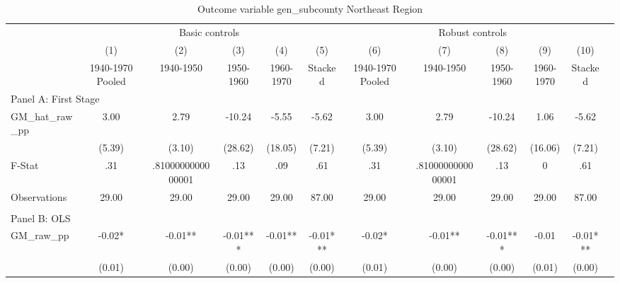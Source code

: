  \begin{table}[htbp]\centering {} \begin{threeparttable} \caption{Outcome variable gen\_subcounty Northeast Region} \begin{tabular}{l*{11}{c}} \toprule
          &\multicolumn{5}{c}{Basic controls}                                   &\multicolumn{5}{c}{Robust controls}                                  \\\cmidrule(lr){2-6}\cmidrule(lr){7-11}
          &\multicolumn{1}{c}{(1)}&\multicolumn{1}{c}{(2)}&\multicolumn{1}{c}{(3)}&\multicolumn{1}{c}{(4)}&\multicolumn{1}{c}{(5)}&\multicolumn{1}{c}{(6)}&\multicolumn{1}{c}{(7)}&\multicolumn{1}{c}{(8)}&\multicolumn{1}{c}{(9)}&\multicolumn{1}{c}{(10)}\\
          &\multicolumn{1}{c}{1940-1970 Pooled}&\multicolumn{1}{c}{1940-1950}&\multicolumn{1}{c}{1950-1960}&\multicolumn{1}{c}{1960-1970}&\multicolumn{1}{c}{Stacked}&\multicolumn{1}{c}{1940-1970 Pooled}&\multicolumn{1}{c}{1940-1950}&\multicolumn{1}{c}{1950-1960}&\multicolumn{1}{c}{1960-1970}&\multicolumn{1}{c}{Stacked}\\
\cmidrule(lr){1-11}
\multicolumn{10}{l}{Panel A: First Stage}\\
\cmidrule(lr){1-11}
GM\_hat\_raw\_pp&      3.00   &      2.79   &    -10.24   &     -5.55   &     -5.62   &      3.00   &      2.79   &    -10.24   &      1.06   &     -5.62   \\
          &    (5.39)   &    (3.10)   &   (28.62)   &   (18.05)   &    (7.21)   &    (5.39)   &    (3.10)   &   (28.62)   &   (16.06)   &    (7.21)   \\
\midrule
F-Stat    &       .31   &.8100000000000001   &       .13   &       .09   &       .61   &       .31   &.8100000000000001   &       .13   &         0   &       .61   \\
Observations&     29.00   &     29.00   &     29.00   &     29.00   &     87.00   &     29.00   &     29.00   &     29.00   &     29.00   &     87.00   \\
\cmidrule[\heavyrulewidth](lr){1-11} \\ \cmidrule[\heavyrulewidth](lr){1-11}
\multicolumn{10}{l}{Panel B: OLS}\\
\cmidrule(lr){1-11}
GM\_raw\_pp &     -0.02*  &     -0.01** &     -0.01***&     -0.01** &     -0.01***&     -0.02*  &     -0.01** &     -0.01***&     -0.01   &     -0.01***\\
          &    (0.01)   &    (0.00)   &    (0.00)   &    (0.00)   &    (0.00)   &    (0.01)   &    (0.00)   &    (0.00)   &    (0.01)   &    (0.00)   \\

\end{tabular}
\end{threeparttable}
\end{table}
